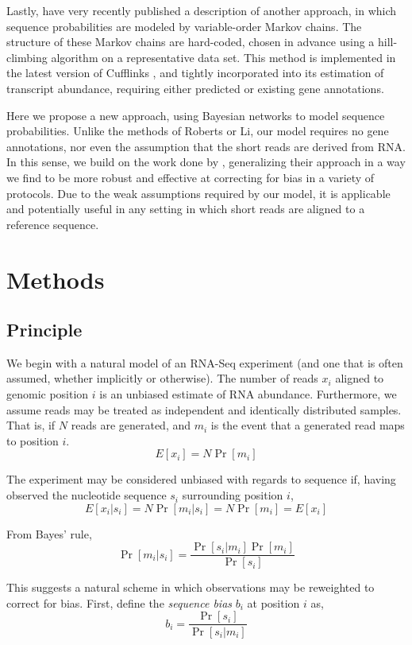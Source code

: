 \documentclass{bioinfo}
\begin{document}
Lastly, \citet{Roberts2011} have very recently published a description of
another approach, in which sequence probabilities are modeled by variable-order
Markov chains. The structure of these Markov chains are hard-coded, chosen in
advance using a hill-climbing algorithm on a representative data set. This method
is implemented in the latest version of Cufflinks \citep{Trapnell2010}, and
tightly incorporated into its estimation of transcript abundance, requiring
either predicted or existing gene annotations.

Here we propose a new approach, using Bayesian networks to model sequence
probabilities. Unlike the methods of Roberts or Li, our model requires no gene
annotations, nor even the assumption that the short reads are derived from RNA.
In this sense, we build on the work done by \citet{Hansen2010}, generalizing
their approach in a way we find to be more robust and effective at correcting
for bias in a variety of protocols. Due to the weak assumptions required by our
model, it is applicable and potentially useful in any setting in which short
reads are aligned to a reference sequence.

\section{Methods}

\subsection{Principle}

We begin with a natural model of an RNA-Seq experiment (and one that is often
assumed, whether implicitly or otherwise). The number of reads $x_i$ aligned to
genomic position $i$ is an unbiased estimate of RNA abundance. Furthermore, we
assume reads may be treated as independent and identically distributed samples.
That is, if $N$ reads are generated, and $m_i$ is the event that a generated
read maps to position $i$.
$$ E[x_i] = N \Pr[m_i] $$

The experiment may be considered unbiased  with regards to sequence if, having
observed the nucleotide sequence $s_i$ surrounding position $i$,
$$ E[ x_i | s_i ] = N \Pr[ m_i | s_i ] = N \Pr[ m_i ] = E[ x_i ] $$

From Bayes' rule,
$$ \Pr[ m_i | s_i ] = \frac{ \Pr[ s_i | m_i ] \Pr[ m_i ] }{ \Pr[ s_i ] } $$

This suggests a natural scheme in which observations may be reweighted to
correct for bias.  First, define the \emph{sequence bias} $b_i$ at position $i$
as,
$$ b_i = \frac{ \Pr[ s_i ] } { \Pr[ s_i | m_i ] } $$
\end{document}
